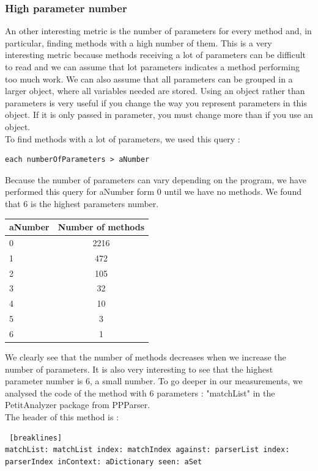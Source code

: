 \subsubsection{High parameter number}
An other interesting metric is the number of parameters for every method and, in particular, finding methods with a high number of them.  This is a very interesting metric because methods receiving a lot of parameters can be difficult to read and we can assume that lot parameters indicates a method performing too much work.  We can also assume that all parameters can be grouped in a larger object, where all variables needed are stored.  Using an object rather than parameters is very useful if you change the way you represent parameters in this object.  If it is only passed in parameter, you must change more than if you use an object.\\
To find methods with a lot of parameters, we used this query :
\begin{lstlisting}
each numberOfParameters > aNumber
\end{lstlisting}
Because the number of parameters can vary depending on the program, we have performed this query for aNumber form 0 until we have no methods.  We found that 6 is the highest parameters number. \\
\begin{center}
\begin{tabular}{|l|c|}
  \hline
  aNumber& Number of methods \\
  \hline
  0 & 2216 \\
  1 & 472 \\
  2 & 105 \\
  3 & 32 \\
  4 & 10 \\
  5 & 3 \\
  6 & 1 \\
  \hline
\end{tabular}
\end{center}
We clearly see that the number of methods decreases when we increase the number of parameters.  It is also very interesting to see that the highest parameter number is 6, a small number.  To go deeper in our measurements, we analysed the code of the method with 6 parameters :  "matchList" in the PetitAnalyzer package from PPParser.\\
The header of this method is :
\begin{lstlisting} [breaklines]
matchList: matchList index: matchIndex against: parserList index: parserIndex inContext: aDictionary seen: aSet
\end{lstlisting}
